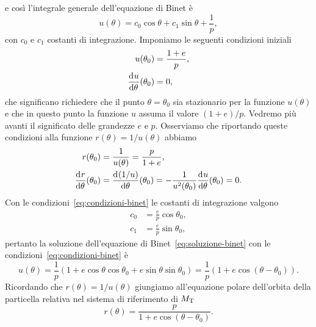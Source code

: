 e così l'integrale generale dell'equazione di Binet è
\begin{equation}
  \label{eq:soluzione-binet}
  u(\theta) = c_0\cos\theta + c_1\sin\theta + \frac{1}{p},
\end{equation}
con $c_0$ e $c_1$ costanti di integrazione. Imponiamo le seguenti condizioni
iniziali
\begin{subequations}
  \label{eq:condizioni-binet}
  \begin{align}
    u(\theta_0) &= \frac{1+e}{p},\\
    \frac{{\mathop{}\!\mathrm{d}^{}}u}{\mathop{}\!\mathrm{d} {\theta}^{}}(\theta_0) &= 0,
  \end{align}
\end{subequations}
che significano richiedere che il punto $\theta = \theta_0$ sia stazionario per
la funzione $u(\theta)$ e che in questo punto la funzione $u$ assuma il valore
$(1+e)/p$. Vedremo più avanti il significato delle grandezze $e$ e
$p$. Osserviamo che riportando queste condizioni alla funzione
$r(\theta)=1/u(\theta)$ abbiamo
\begin{subequations}
  \begin{align}
    r(\theta_0) &= \frac{1}{u(\theta)} = \frac{p}{1+e}, \\
    \frac{{\mathop{}\!\mathrm{d}^{}}r}{\mathop{}\!\mathrm{d} {\theta}^{}}(\theta_0) &= \frac{{\mathop{}\!\mathrm{d}^{}}(1/u)}{\mathop{}\!\mathrm{d} {\theta}^{}}(\theta_0) =
    -\frac{1}{u^2(\theta_0)} \frac{{\mathop{}\!\mathrm{d}^{}}u}{\mathop{}\!\mathrm{d} {\theta}^{}}(\theta_0) = 0.
  \end{align}
\end{subequations}
Con le condizioni~\eqref{eq:condizioni-binet} le costanti di integrazione
valgono
\begin{subequations}
  \label{eq:costanti-binet}
  \begin{align}
    c_0 &= \frac{e}{p}\cos\theta_0, \\
    c_1 &= \frac{e}{p}\sin\theta_0,
  \end{align}
\end{subequations}
pertanto la soluzione dell'equazione di Binet~\eqref{eq:soluzione-binet} con le
condizioni~\eqref{eq:condizioni-binet} è
\begin{equation}
  \label{eq:soluzione2-binet}
  u(\theta) = \frac{1}{p}(1 + e\cos\theta\cos\theta_0 +
  e\sin\theta\sin\theta_0) =  \frac{1}{p}(1+e\cos(\theta-\theta_0)).
\end{equation}
Ricordando che $r(\theta)=1/u(\theta)$ giungiamo all'equazione polare
dell'orbita della particella relativa nel sistema di riferimento di
$M_\textup{T}$
\begin{equation}
  \label{eq:orbita}
  r(\theta) = \frac{p}{1+e\cos(\theta-\theta_0)}.
\end{equation}

